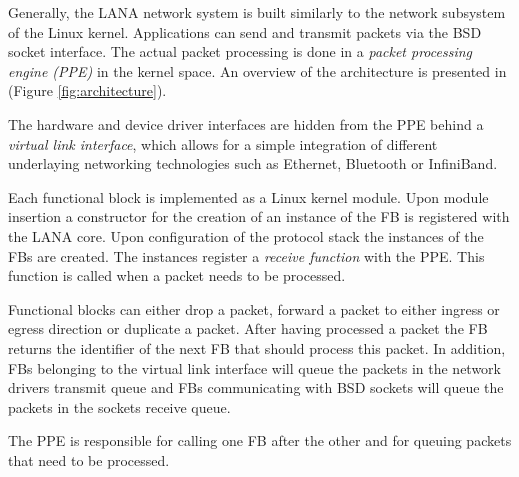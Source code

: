 \documentclass{sig-alternate}
\newcommand{\daniel}[1]{\textcolor{red}{\emph{DB: #1}}}
\begin{document}
Generally, the LANA network system is built similarly to the network subsystem of the Linux kernel.
Applications can send and transmit packets via the BSD socket interface. The actual packet processing is done in a \textit{packet processing engine (PPE)} in the kernel space. An overview of the architecture is presented in (Figure \ref{fig:architecture}).


The hardware and device driver interfaces are hidden from the PPE behind a \textit{virtual link interface}, which allows for a simple integration of different underlaying networking technologies such as Ethernet, Bluetooth or InfiniBand.

Each functional block is implemented as a Linux kernel module. 
Upon module insertion a constructor for the creation of an instance of the FB is registered with the LANA core. Upon configuration of the protocol stack the instances of the FBs are created. The instances register a \textit{receive function} with the PPE. This function is called when a packet needs to be processed.

Functional blocks can either drop a packet, forward a packet to either ingress or egress direction or duplicate a packet. After having processed a packet the FB returns the identifier of the next FB that should process this packet. In addition, FBs belonging to the virtual link interface will queue the packets in the network drivers transmit queue and FBs communicating with BSD sockets will queue the packets in the sockets receive queue.

The PPE is responsible for calling one FB after the other and for queuing packets that need to be processed.

\end{document}
